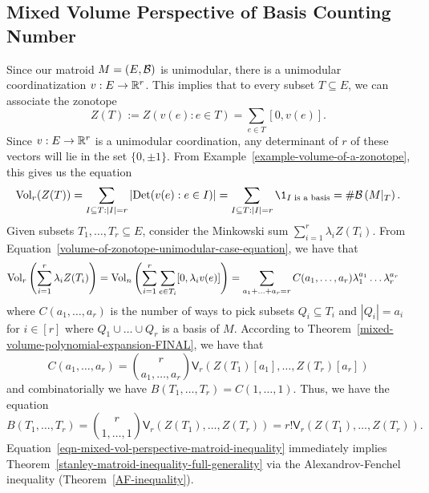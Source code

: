 \documentclass{puthesis-UG}
\begin{document}
\subsection{Mixed Volume Perspective of Basis Counting Number} \label{section-mixed-volume-persepctive-of-basis-counting-number}

Since our matroid $M = (E, \mathcal{B})$ is unimodular, there is a unimodular coordinatization $v : E \to \mathbb{R}^r$. This implies that to every subset $T \subseteq E$, we can associate the zonotope
\[
	Z(T) := Z(v(e) : e \in T) = \sum_{e \in T}[0, v(e)].
\]
Since $v : E \to \mathbb{R}^r$ is a unimodular coordination, any determinant of $r$ of these vectors will lie in the set $\{0, \pm 1\}$. From Example~\ref{example-volume-of-a-zonotope}, this gives us the equation 
\begin{equation} \label{volume-of-zonotope-unimodular-case-equation}
	\Vol_r(Z(T)) = \sum_{I \subseteq T : |I| = r} |\text{Det}(v(e) : e \in I)| = \sum_{I \subseteq T : |I| = r} \1_{I \text{ is a basis}} = \# \mcB \left (M|_T \right ).
\end{equation}
Given subsets $T_1, \ldots, T_r \subseteq E$, consider the Minkowski sum $\sum_{i = 1}^r \lambda_i Z(T_i)$. From Equation~\ref{volume-of-zonotope-unimodular-case-equation}, we have that 
\begin{align*}
	\operatorname{Vol}_r \left ( \sum_{i = 1}^r \lambda_i Z(T_i) \right ) & = \operatorname{Vol}_n \left (\sum_{i = 1}^r \sum_{e \in T_i} [0, \lambda_i v(e)] \right ) = \sum_{a_1 + \ldots + a_r = r} C(a_1, \ldots, a_r) \lambda_1^{a_1} \ldots \lambda_r^{a_r}
\end{align*}
where $C(a_1, \ldots, a_r)$ is the number of ways to pick subsets $Q_i \subseteq T_i$ and $|Q_i| = a_i$ for $i \in [r]$ where $Q_1 \cup \ldots \cup Q_r$ is a basis of $M$. According to Theorem~\ref{mixed-volume-polynomial-expansion-FINAL}, we have that 
\[
	C(a_1, \ldots, a_r) = \binom{r}{a_1, \ldots, a_r} \mathsf{V}_r (Z(T_1)[a_1], \ldots, Z(T_r)[a_r])
\]
and combinatorially we have $B(T_1, \ldots, T_r) = C(1, \ldots, 1)$. Thus, we have the equation
\begin{equation} \label{eqn-mixed-vol-perspective-matroid-inequality}
	B(T_1, \ldots, T_r) = \binom{r}{1, \ldots, 1} \mathsf{V}_r(Z(T_1), \ldots, Z(T_r)) = r! \mathsf{V}_r(Z(T_1), \ldots, Z(T_r)). 
\end{equation}
Equation~\ref{eqn-mixed-vol-perspective-matroid-inequality} immediately implies Theorem~\ref{stanley-matroid-inequality-full-generality} via the Alexandrov-Fenchel inequality (Theorem~\ref{AF-inequality}).
\end{document}
